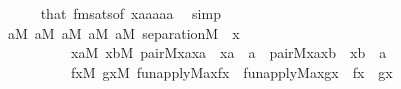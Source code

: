 \begin{isabellebody}
\ \ \ \ \isamarkupfalse%
\ that\ fmsats{\isacharbrackleft}{\kern0pt}of\ {\isachardoublequoteopen}{\isacharbrackleft}{\kern0pt}x{\isacharcomma}{\kern0pt}a{}{\isacharcomma}{\kern0pt}a{}{\isacharcomma}{\kern0pt}a{}{\isacharcomma}{\kern0pt}a{}{\isacharcomma}{\kern0pt}a{}{\isacharbrackright}{\kern0pt}{\isachardoublequoteclose}{\isacharbrackright}{\kern0pt}\ \isamarkupfalse%
\ simp\isanewline
\ \ \isamarkupfalse%
\isanewline
\ \ \isamarkupfalse%
\ {\isachardoublequoteopen}{\isasymforall}a{}{\isasymin}M{\isachardot}{\kern0pt}\ {\isasymforall}a{}{\isasymin}M{\isachardot}{\kern0pt}\ {\isasymforall}a{}{\isasymin}M{\isachardot}{\kern0pt}\ {\isasymforall}a{}{\isasymin}M{\isachardot}{\kern0pt}\ {\isasymforall}a{}{\isasymin}M{\isachardot}{\kern0pt}\ separation{\isacharparenleft}{\kern0pt}{\isacharhash}{\kern0pt}{\isacharhash}{\kern0pt}M{\isacharcomma}{\kern0pt}\ {\isasymlambda}\ x\ {\isachardot}{\kern0pt}\isanewline
\ \ \ \ \ \ \ \ \ \ {\isasymexists}xa{\isasymin}M{\isachardot}{\kern0pt}\ {\isasymexists}xb{\isasymin}M{\isachardot}{\kern0pt}\ pair{\isacharparenleft}{\kern0pt}{\isacharhash}{\kern0pt}{\isacharhash}{\kern0pt}M{\isacharcomma}{\kern0pt}x{\isacharcomma}{\kern0pt}a{}{\isacharcomma}{\kern0pt}xa{\isacharparenright}{\kern0pt}\ {\isacharampersand}{\kern0pt}\ xa\ {\isasymin}\ a{}\ {\isacharampersand}{\kern0pt}\ pair{\isacharparenleft}{\kern0pt}{\isacharhash}{\kern0pt}{\isacharhash}{\kern0pt}M{\isacharcomma}{\kern0pt}x{\isacharcomma}{\kern0pt}a{}{\isacharcomma}{\kern0pt}xb{\isacharparenright}{\kern0pt}\ {\isacharampersand}{\kern0pt}\ xb\ {\isasymin}\ a{}\ {\isacharampersand}{\kern0pt}\isanewline
\ \ \ \ \ \ \ \ \ \ {\isacharparenleft}{\kern0pt}{\isasymexists}fx{\isasymin}M{\isachardot}{\kern0pt}\ {\isasymexists}gx{\isasymin}M{\isachardot}{\kern0pt}\ fun{\isacharunderscore}{\kern0pt}apply{\isacharparenleft}{\kern0pt}{\isacharhash}{\kern0pt}{\isacharhash}{\kern0pt}M{\isacharcomma}{\kern0pt}a{}{\isacharcomma}{\kern0pt}x{\isacharcomma}{\kern0pt}fx{\isacharparenright}{\kern0pt}\ {\isacharampersand}{\kern0pt}\ fun{\isacharunderscore}{\kern0pt}apply{\isacharparenleft}{\kern0pt}{\isacharhash}{\kern0pt}{\isacharhash}{\kern0pt}M{\isacharcomma}{\kern0pt}a{}{\isacharcomma}{\kern0pt}x{\isacharcomma}{\kern0pt}gx{\isacharparenright}{\kern0pt}\ {\isacharampersand}{\kern0pt}\ fx\ {\isasymnoteq}\ gx{\isacharparenright}{\kern0pt}{\isacharparenright}{\kern0pt}{\isachardoublequoteclose}\isanewline

\end{isabellebody}

